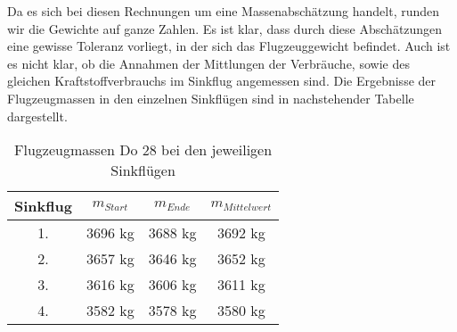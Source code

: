 \noindent Da es sich bei diesen Rechnungen um eine Massenabschätzung handelt, runden wir die Gewichte auf ganze Zahlen. Es ist klar, dass durch diese Abschätzungen eine gewisse Toleranz vorliegt, in der sich das Flugzeuggewicht befindet. Auch ist es nicht klar, ob die Annahmen der Mittlungen der Verbräuche, sowie des gleichen Kraftstoffverbrauchs im Sinkflug angemessen sind. Die Ergebnisse der Flugzeugmassen in den einzelnen Sinkflügen sind in nachstehender Tabelle dargestellt.

\begin{table}[h]
	\centering
	\begin{tabular}{|c|c|c|c|}
		\hline
		\textbf{Sinkflug} & \textbf{$m_{Start}$} & \textbf{$m_{Ende}$} & \textbf{$m_{Mittelwert}$} \\ \hline
		1.	& 3696 kg	& 3688 kg & 3692 kg    \\ \hline
		2.	& 3657 kg   & 3646 kg & 3652 kg    \\ \hline
		3.	& 3616 kg	& 3606 kg & 3611 kg	   \\ \hline
		4.  & 3582 kg	& 3578 kg & 3580 kg    \\ \hline
	
		
		
	\end{tabular}
	\caption{Flugzeugmassen Do 28 bei den jeweiligen Sinkflügen}
\end{table}


\newpage
